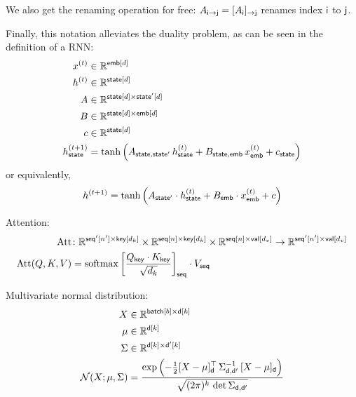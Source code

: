 \documentclass{article}
\DeclareMathOperator*{\softmax}{softmax}
\begin{document}
We also get the renaming operation for free: $A_{\mathsf{i}\rightarrow\mathsf{j}} = [A_{\mathsf{i}}]_{\rightarrow\mathsf{j}}$ renames index $\mathsf{i}$ to $\mathsf{j}$.

Finally, this notation alleviates the duality problem, as can be seen in the definition of a RNN:
\begin{align*}
x^{(t)} &\in \mathbb{R}^{\mathsf{emb}[d]} \\
h^{(t)} &\in \mathbb{R}^{\mathsf{state}[d]} \\
A &\in \mathbb{R}^{\mathsf{state}[d] \times \mathsf{state'}[d]} \\
B &\in \mathbb{R}^{\mathsf{state}[d] \times \mathsf{emb}[d]} \\
c &\in \mathbb{R}^{\mathsf{state}[d]} \\
h^{(t+1)}_{\mathsf{state}} &= \tanh\left( A_{\mathsf{state},\mathsf{state'}} \, h^{(t)}_{\mathsf{state}} + B_{\mathsf{state},\mathsf{emb}} \, x^{(t)}_{\mathsf{emb}} + c_{\mathsf{state}} \right)
\end{align*}
or equivalently,
\begin{equation*}
h^{(t+1)} = \tanh\left( A_{\mathsf{state'}} \cdot h^{(t)}_{\mathsf{state}} + B_{\mathsf{emb}} \cdot x^{(t)}_{\mathsf{emb}} + c \right)
\end{equation*}

Attention:
\begin{align*}
  \text{Att} &\colon \mathbb{R}^{\nset{seq'}{n'} \times\nset{key}{d_k}} \times \mathbb{R}^{\nset{seq}{n} \times\nset{key}{d_k}} \times \mathbb{R}^{\nset{seq}{n} \times\nset{val}{d_v}} \rightarrow \mathbb{R}^{\nset{seq'}{n'} \times\nset{val}{d_v}} \\
  \text{Att}(Q,K,V) &= \softmax \left[ \frac{Q_{\name{key}} \cdot K_\name{key}}{\sqrt{d_k}} \right]_{\name{seq}} \cdot V_{\name{seq}}
\end{align*}

Multivariate normal distribution:
\begin{align*} 
X &\in \mathbb{R}^{\mathsf{batch}[{b}] \times \mathsf{d}[{k}]}  \\
\mu &\in \mathbb{R}^{{\mathsf{d}[{k}]}}  \\
\Sigma & \in   \mathbb{R}^{{\mathsf{d}[k] \times \mathsf{d'}[k]}}  \\
{\cal N}(X; \mu, \Sigma) &= \frac{\displaystyle \exp\left(-\tfrac{1}{2} [X - \mu]_{\mathsf{d}}^\top \, \Sigma_{\mathsf{d},\mathsf{d'}}^{-1} \, [X - \mu]_{\mathsf{d}} \right)}{\sqrt{(2 \pi)^k \, \mathop{\text{det}} \Sigma_{\mathsf{d},\mathsf{d'}}}}
\end{align*}
\end{document}
